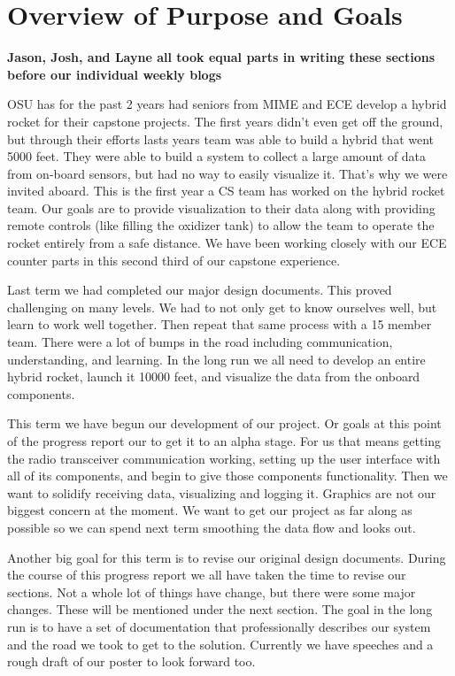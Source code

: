 \documentclass[10pt,draftclsnofoot,onecolumn]{IEEEtran}
\begin{document}
\section{Overview of Purpose and Goals}
{\bf Jason, Josh, and Layne all took equal parts in writing these sections before our individual weekly blogs} \par
OSU has for the past 2 years had seniors from MIME and ECE develop a hybrid rocket for their capstone projects. The first years didn't even get off the ground, but through their efforts lasts years team was able to build a hybrid that went 5000 feet. They were able to build a system to collect a large amount of data from on-board sensors, but had no way to easily visualize it. That's why we were invited aboard. This is the first year a CS team has worked on the hybrid rocket team. Our goals are to provide visualization to their data along with providing remote controls (like filling the oxidizer tank) to allow the team to operate the rocket entirely from a safe distance. We have been working closely with our ECE counter parts in this second third of our capstone experience. \par
Last term we had completed our major design documents. This proved challenging on many levels. We had to not only get to know ourselves well, but learn to work well together. Then repeat that same process with a 15 member team. There were a lot of bumps in the road including communication, understanding, and learning. In the long run we all need to develop an entire hybrid rocket, launch it 10000 feet, and visualize the data from the onboard components. \par
This term we have begun our development of our project. Or goals at this point of the progress report our to get it to an alpha stage. For us that means getting the radio transceiver communication working, setting up the user interface with all of its components, and begin to give those components functionality. Then we want to solidify receiving data, visualizing and logging it. Graphics are not our biggest concern at the moment. We want to get our project as far along as possible so we can spend next term smoothing the data flow and looks out. \par
Another big goal for this term is to revise our original design documents. During the course of this progress report we all have taken the time to revise our sections. Not a whole lot of things have change, but there were some major changes. These will be mentioned under the next section. The goal in the long run is to have a set of documentation that professionally describes our system and the road we took to get to the solution. Currently we have speeches and a rough draft of our poster to look forward too. \par
\end{document}

